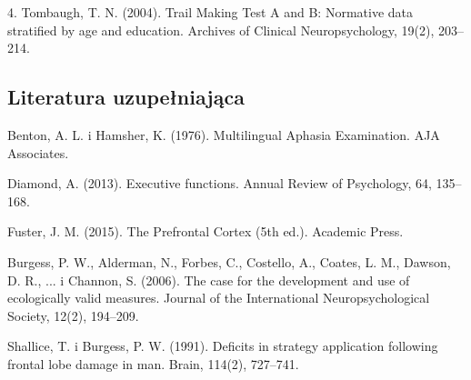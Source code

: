\documentclass[11pt,a4paper]{article}
\begin{document}
4. Tombaugh, T. N. (2004). Trail Making Test A and B: Normative data stratified by age and education. Archives of Clinical Neuropsychology, 19(2), 203–214.

\subsection{Literatura uzupełniająca}

Benton, A. L. i Hamsher, K. (1976). Multilingual Aphasia Examination. AJA Associates.

Diamond, A. (2013). Executive functions. Annual Review of Psychology, 64, 135–168.

Fuster, J. M. (2015). The Prefrontal Cortex (5th ed.). Academic Press.

Burgess, P. W., Alderman, N., Forbes, C., Costello, A., Coates, L. M., Dawson, D. R., ... i Channon, S. (2006). The case for the development and use of ecologically valid measures. Journal of the International Neuropsychological Society, 12(2), 194–209.

Shallice, T. i Burgess, P. W. (1991). Deficits in strategy application following frontal lobe damage in man. Brain, 114(2), 727–741.
\end{document}
